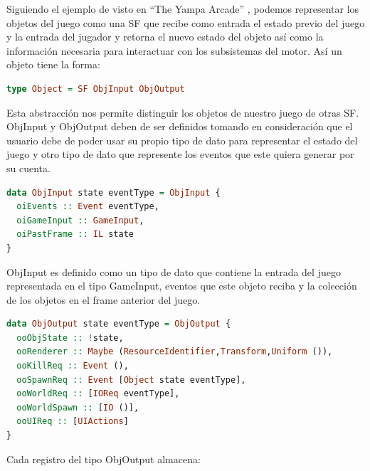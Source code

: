 Siguiendo el ejemplo de visto en “The Yampa Arcade” \cite{Courtney2003b}, podemos representar los objetos del juego como una SF que recibe como entrada el estado previo del juego y la entrada del jugador y retorna el nuevo estado del objeto así como la información necesaria para interactuar con los subsistemas del motor. Así un objeto tiene la forma:

\begin{lstlisting}[label={ObjDef1},frame=single,language=Haskell]
type Object = SF ObjInput ObjOutput
\end{lstlisting}

Esta abstracción nos permite distinguir los objetos de nuestro juego de otras SF. ObjInput y ObjOutput deben de ser definidos tomando en consideración que el usuario debe de poder usar su propio tipo de dato para representar el estado del juego y otro tipo de dato que represente los eventos que este quiera generar por su cuenta.

\begin{lstlisting}[label={ObjInputDef},frame=single,language=Haskell]
data ObjInput state eventType = ObjInput {
  oiEvents :: Event eventType,
  oiGameInput :: GameInput,
  oiPastFrame :: IL state
}
\end{lstlisting}

ObjInput es definido como un tipo de dato que contiene la entrada del juego representada en el tipo GameInput, eventos que este objeto reciba y la colección de los objetos en el frame anterior del juego.

\begin{lstlisting}[label={ObjOutputDef},frame=single,language=Haskell]
data ObjOutput state eventType = ObjOutput {
  ooObjState :: !state,
  ooRenderer :: Maybe (ResourceIdentifier,Transform,Uniform ()),
  ooKillReq :: Event (),
  ooSpawnReq :: Event [Object state eventType],
  ooWorldReq :: [IOReq eventType],
  ooWorldSpawn :: [IO ()],
  ooUIReq :: [UIActions]
}
\end{lstlisting}

Cada registro del tipo ObjOutput almacena:

